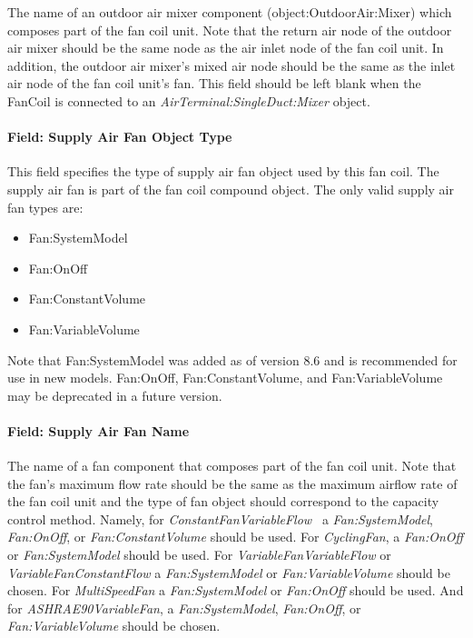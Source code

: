 The name of an outdoor air mixer component (object:OutdoorAir:Mixer) which composes part of the fan coil unit. Note that the return air node of the outdoor air mixer should be the same node as the air inlet node of the fan coil unit. In addition, the outdoor air mixer's mixed air node should be the same as the inlet air node of the fan coil unit's fan. This field should be left blank when the FanCoil is connected to an \textit{AirTerminal:SingleDuct:Mixer} object.

\paragraph{Field: Supply Air Fan Object Type}\label{field-supply-air-fan-object-type-000}

This field specifies the type of supply air fan object used by this fan coil. The supply air fan is part of the fan coil compound object. The only valid supply air fan types are:

\begin{itemize}
\item
  Fan:SystemModel
\item
  Fan:OnOff
\item
  Fan:ConstantVolume
\item
  Fan:VariableVolume
\end{itemize}

Note that Fan:SystemModel was added as of version 8.6 and is recommended for use in new models.  Fan:OnOff, Fan:ConstantVolume, and Fan:VariableVolume may be deprecated in a future version.

\paragraph{Field: Supply Air Fan Name}\label{field-supply-air-fan-name-000}

The name of a fan component that composes part of the fan coil unit. Note that the fan's maximum flow rate should be the same as the maximum airflow rate of the fan coil unit and the type of fan object should correspond to the capacity control method. Namely, for \emph{ConstantFanVariableFlow~} a \emph{Fan:SystemModel}, \emph{Fan:OnOff}, or \emph{Fan:ConstantVolume} should be used. For \emph{CyclingFan}, a \emph{Fan:OnOff} or \emph{Fan:SystemModel} should be used. For \emph{VariableFanVariableFlow} or \emph{VariableFanConstantFlow} a \emph{Fan:SystemModel} or \emph{Fan:VariableVolume} should be chosen. For \emph{MultiSpeedFan} a \emph{Fan:SystemModel} or \emph{Fan:OnOff} should be used. And for \emph{ASHRAE90VariableFan}, a \emph{Fan:SystemModel}, \emph{Fan:OnOff}, or \emph{Fan:VariableVolume} should be chosen.

